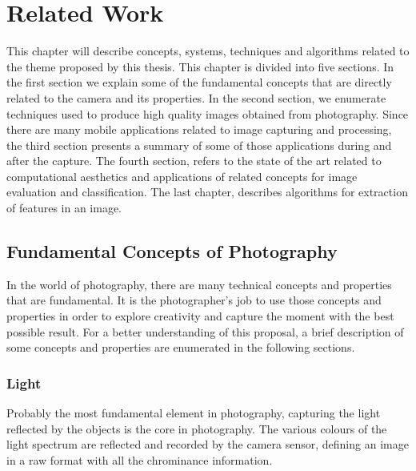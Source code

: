 \chapter{Related Work}
\label{cha:related_work}

This chapter will describe concepts, systems, techniques and algorithms related to the theme proposed by this thesis.
This chapter is divided into five sections. In the first section we explain some of the fundamental concepts that are directly related to the camera and its properties. In the second section, we enumerate techniques used to produce high quality images obtained from photography. Since there are many mobile applications related to image capturing and processing, the third section presents a summary of some of those applications during and after the capture. The fourth section, refers to the state of the art related to computational aesthetics and applications of related concepts for image evaluation and classification. The last chapter, describes algorithms for extraction of features in an image.

\section{Fundamental Concepts of Photography}
\label{sec:concepts}
In the world of photography, there are many technical concepts and properties that are fundamental. It is the photographer's job to use those concepts and properties in order to explore creativity and capture the moment with the best possible result.
For a better understanding of this proposal,  a brief description of some concepts and properties are enumerated in the following sections.

\subsection{Light}
\label{sub:light}
Probably the most fundamental element in photography, capturing the light reflected by the objects is the core in photography. The various colours of the light spectrum are reflected and recorded by the camera sensor, defining an image in a raw format with all the chrominance information.

